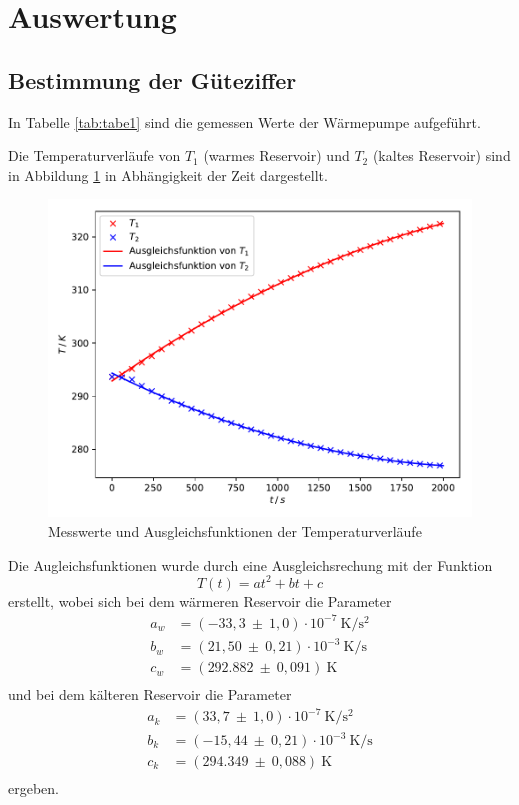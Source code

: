 
\section{Auswertung}
\label{sec:Auswertung}
\subsection{Bestimmung der Güteziffer}
In Tabelle \ref{tab:tabe1} sind die gemessen Werte der Wärmepumpe aufgeführt.

\noindent Die Temperaturverläufe von $ T_1 $ (warmes Reservoir) und $ T_2 $ (kaltes
Reservoir) sind in Abbildung \ref{fig:plot1} in Abhängigkeit der Zeit dargestellt.
\begin{figure}[H]
  \centering
  \includegraphics{plot1.pdf}
  \caption{Messwerte und Ausgleichsfunktionen der Temperaturverläufe}
  \label{fig:plot1}
\end{figure}
Die Augleichsfunktionen wurde durch eine Ausgleichsrechung mit der Funktion
\begin{equation}
  T(t) = at^2 +bt +c
\end{equation}
erstellt, wobei sich bei dem wärmeren Reservoir die Parameter
\begin{align*}
  a_w &= (-33,3 \: \pm \: 1,0) \cdot 10^{-7} \: \si{\kelvin\per\second\squared}\\
  b_w &= (21,50 \: \pm \: 0,21) \cdot 10^{-3} \: \si{\kelvin\per\second}\\
  c_w &= (292.882 \: \pm \: 0,091) \: \si{\kelvin} \\
\end{align*}
und bei dem kälteren Reservoir die Parameter
\begin{align*}
  a_k &= (33,7 \: \pm \: 1,0) \cdot 10^{-7} \: \si{\kelvin\per\second\squared}\\
  b_k &= (-15,44 \: \pm \: 0,21) \cdot 10^{-3} \: \si{\kelvin\per\second}\\
  c_k &= (294.349 \: \pm \: 0,088) \: \si{\kelvin}\\
\end{align*}
ergeben.

